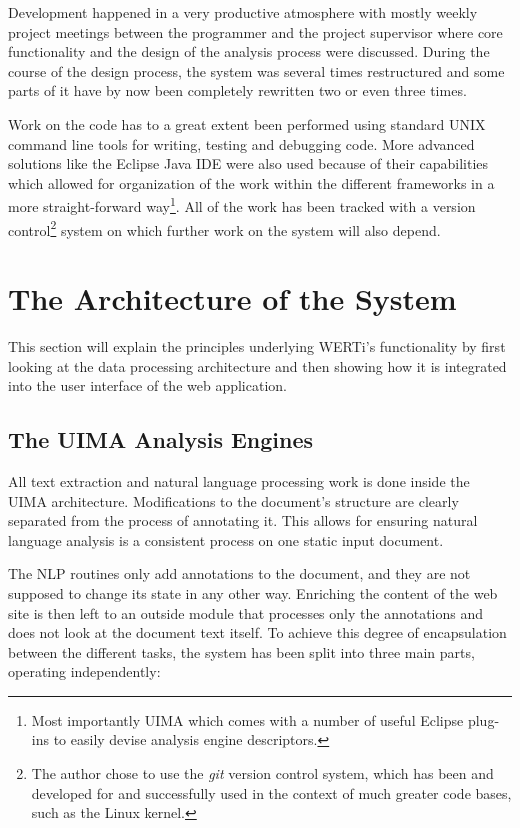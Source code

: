 \documentclass[12pt]{scrartcl}
\begin{document}
Development happened in a very productive atmosphere with mostly weekly project
meetings between the programmer and the project supervisor where core
functionality and the design of the analysis process were discussed. During the
course of the design process, the system was several times restructured and some
parts of it have by now been completely rewritten two or even three times.

Work on the code has to a great extent been  performed using standard UNIX command line
tools for writing, testing and debugging code. More advanced solutions
like the Eclipse Java IDE were also used because of their capabilities which
allowed for organization of the work within the different frameworks in a more
straight-forward way\footnote{Most
importantly UIMA which comes with a number of useful Eclipse plug-ins to easily devise
analysis engine descriptors.}. All of the work has been tracked with a version
control\footnote{The author chose to use the \emph{git} version control system,
which has been and developed for and successfully used in the context of much greater
code bases, such as the Linux kernel.} system on which further work on the system
will also depend.

\section{The Architecture of the System}

This section will explain the principles underlying WERTi's functionality by
first looking at the data processing architecture and then showing how it is
integrated into the user interface of the web application.


\subsection{The UIMA Analysis Engines}\label{sec:UIMA}

All text extraction and natural language processing work is done inside the UIMA
architecture.  Modifications  to the document's structure are clearly separated
from the process of annotating it. This allows for ensuring natural language
analysis is a consistent process on one static input document.

The NLP routines only add annotations to the document, and they are not supposed
to change its state in any other way. Enriching the content of the web site is
then left to an outside module that processes only the annotations and does not
look at the document text itself. To achieve this degree of encapsulation
between the different tasks, the system has been split into three main parts,
operating independently:
\end{document}
